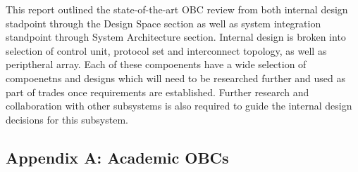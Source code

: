 \documentclass[10pt]{../datasheet}
\begin{document}
This report outlined the state-of-the-art OBC review from both internal design
stadpoint through the Design Space section as well as system integration
standpoint through System Architecture section. Internal design is broken into
selection of control unit, protocol set and interconnect topology, as well as
periptheral array. Each of these compoenents have a wide selection of
compoenetns and designs which will need to be researched further and used as
part of trades once requirements are established. Further research and
collaboration with other subsystems is also required to guide the internal
design decisions for this subsystem.
\clearpage
\appendix
\begin{landscape}
  \section{Appendix A: Academic OBCs}
  \makeatletter
  \def\@currentlabel{A}
  \makeatother
  \label{sec:appendix_a}


\end{landscape}
\end{document}
